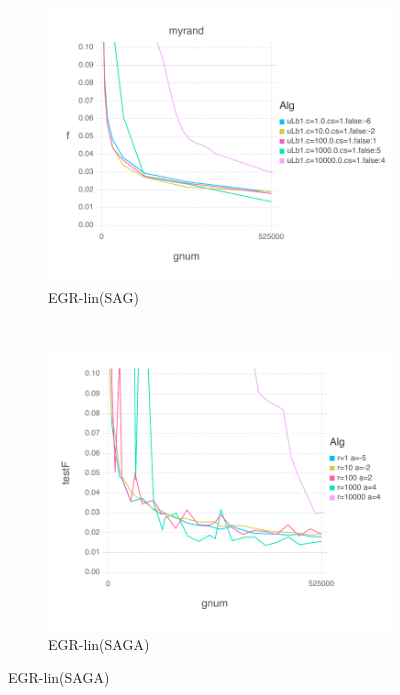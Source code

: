 \documentclass[11pt]{article}
\begin{document}
      \begin{figure}[H]
          \centering
   \begin{subfigure}[b]{0.45\textwidth}
              \includegraphics[width=\textwidth]{Figures/myrandBLtrueffFinal-linfalse.pdf}
              \caption{EGR-lin(SAG)}
          \end{subfigure}
          ~ %
          \begin{subfigure}[b]{0.45\textwidth}
              \includegraphics[width=\textwidth]{Figures/myrandBLtrueffFinal-lintrue.pdf}
              \caption{EGR-lin(SAGA)} 
          \end{subfigure}
	   

\end{figure}
\end{document}

